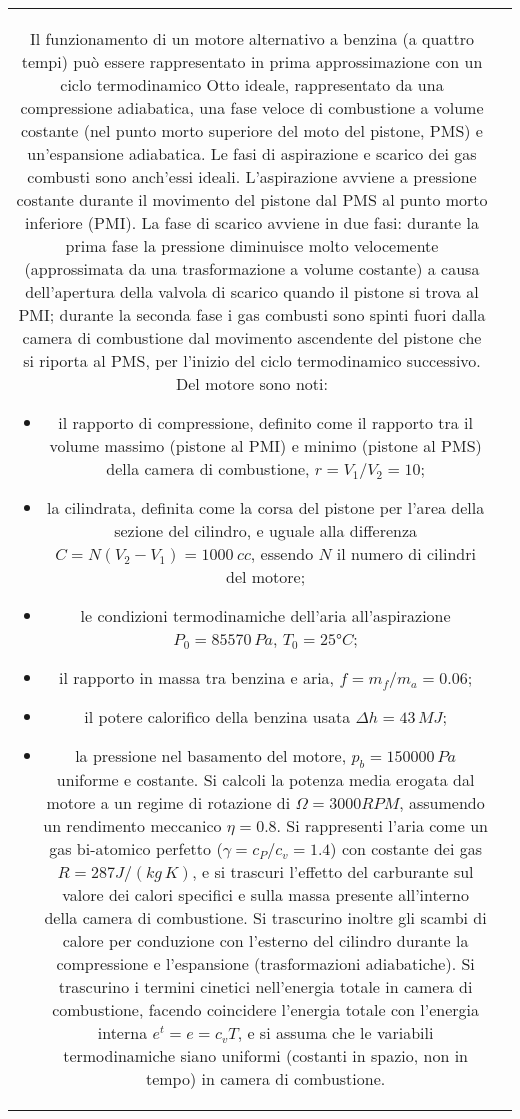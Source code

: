 \noindent
\begin{tabular}{cc}
\begin{minipage}{0.95\textwidth}
\begin{exerciseS}
Il funzionamento di un motore alternativo a benzina (a quattro tempi) può essere rappresentato in prima approssimazione con un ciclo termodinamico Otto ideale, rappresentato da una compressione adiabatica, una fase veloce di combustione a volume costante (nel punto morto superiore del moto del pistone, PMS) e un'espansione adiabatica. Le fasi di aspirazione e scarico dei gas combusti sono anch'essi ideali. L'aspirazione avviene a pressione costante durante il movimento del pistone dal PMS al punto morto inferiore (PMI). La fase di scarico avviene in due fasi: durante la prima fase la pressione diminuisce molto velocemente (approssimata da una trasformazione a volume costante) a causa dell'apertura della valvola di scarico quando il pistone si trova al PMI; durante la seconda fase i gas combusti sono spinti fuori dalla camera di combustione dal movimento ascendente del pistone che si riporta al PMS, per l'inizio del ciclo termodinamico successivo. Del motore sono noti:
\begin{itemize}
 \item il rapporto di compressione, definito come il rapporto tra il volume massimo (pistone al PMI) e minimo (pistone al PMS) della camera di combustione, $r = V_1 / V_2 = 10$;
 \item la cilindrata, definita come la corsa del pistone per l'area della sezione del cilindro, e uguale alla differenza $C = N (V_2 - V_1) = 1000 \ cc$, essendo $N$ il numero di cilindri del motore;
 \item le condizioni termodinamiche dell'aria all'aspirazione $P_0 = 85570 \, Pa$, $T_0 = 25°C$;
 \item il rapporto in massa tra benzina e aria, $f = m_f / m_a = 0.06$;
 \item il potere calorifico della benzina usata $\Delta h = 43 \, MJ$;
 \item la pressione nel basamento del motore, $p_{b} = 150000 \, Pa$ uniforme e costante.
Si calcoli la potenza media erogata dal motore a un regime di rotazione di $\Omega = 3000 RPM$, assumendo un rendimento meccanico $\eta = 0.8$.
Si rappresenti l'aria come un gas bi-atomico perfetto ($\gamma = c_P/ c_v = 1.4$) con costante dei gas $R = 287 J / (kg \, K)$, e si trascuri l'effetto del carburante sul valore dei calori specifici e sulla massa presente all'interno della camera di combustione. Si trascurino inoltre gli scambi di calore per conduzione con l'esterno del cilindro durante la compressione e l'espansione (trasformazioni adiabatiche). Si trascurino i termini cinetici nell'energia totale in camera di combustione, facendo coincidere l'energia totale con l'energia interna $e^t = e = c_v T$, e si assuma che le variabili termodinamiche siano uniformi (costanti in spazio, non in tempo) in camera di combustione.
\end{itemize}
\end{exerciseS}
\end{minipage}
\end{tabular}

